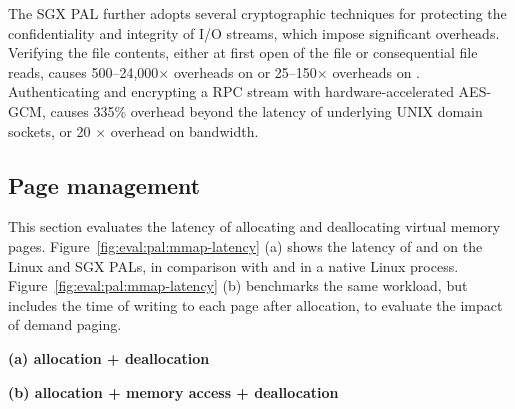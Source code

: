 
The SGX PAL further adopts several cryptographic techniques
for protecting the confidentiality and integrity of I/O streams, which impose significant overheads.
Verifying the file contents, either at first open of the file or consequential file reads,
causes 500--24,000$\times$ overheads on 
or 25--150$\times$ overheads on .
Authenticating and encrypting a RPC stream with hardware-accelerated AES-GCM,
causes \roughly{}335\% overhead beyond the latency of underlying UNIX domain sockets,
or \roughly{}20 $\times$ overhead on bandwidth.






\subsection{Page management}
\label{sec:eval:pal:memory}


This section evaluates the latency of allocating and deallocating virtual memory pages.
Figure~\ref{fig:eval:pal:mmap-latency} (a)
shows the latency of  and   on the Linux and SGX PALs,
in comparison with  and  in a native Linux process.
Figure~\ref{fig:eval:pal:mmap-latency} (b)
benchmarks the same workload, but includes the time of writing to each page after allocation,
to evaluate the impact of demand paging.

\begin{figure*}[t!]
\centering
\footnotesize
{}
\parbox{0.49\textwidth}{\centering\bf (a) allocation + deallocation}
\parbox{0.49\textwidth}{\centering\bf (b) allocation + memory access + deallocation}
\caption{Latency of (a) allocating and deallocating a range of virtual pages, and (b) the same operations with writing to each page after allocation. Lower is better.
The comparison is between (1)  and  on Linux; (2)  and  on the Linux PAL, with and without a \seccomp{} filter ({\bf +SC}) and reference monitor ({\bf +RM}); (3) the same \hostapis{} on the SGX PAL, with and without zeroing the pages before use ({\bf +Zero}).}
\label{fig:eval:pal:mmap-latency}
\end{figure*}


